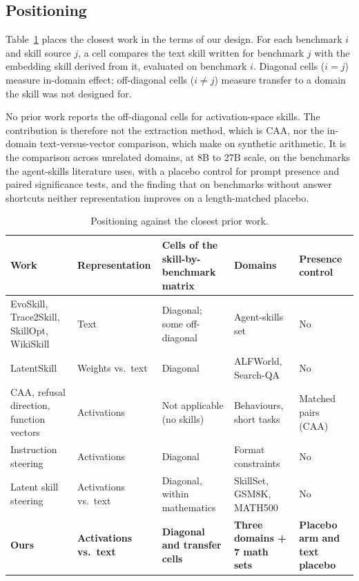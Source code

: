 \documentclass[11pt]{article}
\begin{document}
\subsection{Positioning}

Table~\ref{tab:positioning} places the closest work in the terms of our design. For each benchmark
$i$ and skill source $j$, a cell compares the text skill written for benchmark $j$ with the
embedding skill derived from it, evaluated on benchmark $i$. Diagonal cells ($i=j$) measure
in-domain effect; off-diagonal cells ($i\neq j$) measure transfer to a domain the skill was not
designed for.

No prior work reports the off-diagonal cells for activation-space skills. The contribution is
therefore not the extraction method, which is CAA, nor the in-domain text-versus-vector comparison,
which \citet{jiang2026latent} make on synthetic arithmetic. It is the comparison across unrelated
domains, at 8B to 27B scale, on the benchmarks the agent-skills literature uses, with a placebo
control for prompt presence and paired significance tests, and the finding that on benchmarks
without answer shortcuts neither representation improves on a length-matched placebo.

\begin{table}[t]
\centering\small
\begin{tabular}{@{}p{3.4cm}p{2.3cm}p{3.2cm}p{2.8cm}p{2.5cm}@{}}
\toprule
Work & Representation & Cells of the skill-by-benchmark matrix & Domains & Presence control \\
\midrule
EvoSkill, Trace2Skill, SkillOpt, WikiSkill & Text & Diagonal; some off-diagonal & Agent-skills set & No \\
LatentSkill & Weights vs.\ text & Diagonal & ALFWorld, Search-QA & No \\
CAA, refusal direction, function vectors & Activations & Not applicable (no skills) & Behaviours, short tasks & Matched pairs (CAA) \\
Instruction steering & Activations & Diagonal & Format constraints & No \\
Latent skill steering & Activations vs.\ text & Diagonal, within mathematics & SkillSet, GSM8K, MATH500 & No \\
\textbf{Ours} & \textbf{Activations vs.\ text} & \textbf{Diagonal and transfer cells} & \textbf{Three domains + 7 math sets} & \textbf{Placebo arm and text placebo} \\
\bottomrule
\end{tabular}
\caption{Positioning against the closest prior work.}
\label{tab:positioning}
\end{table}
\end{document}
